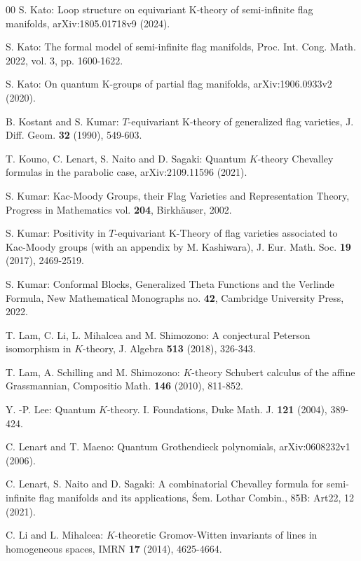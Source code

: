 \documentclass{article}
\begin{document}
\begin{thebibliography}{00}
 S. Kato: Loop structure on equivariant K-theory of semi-infinite flag manifolds, arXiv:1805.01718v9 (2024). 

 S. Kato: The formal model of semi-infinite flag manifolds, Proc. Int. Cong. Math. 2022, vol. 3, pp. 1600-1622.

 S. Kato: On quantum K-groups of partial flag manifolds, arXiv:1906.0933v2 (2020). 

 B. Kostant and S. Kumar: $T$-equivariant K-theory of generalized flag varieties, J. Diff. Geom. {\bf 32} (1990), 549-603. 

 T. Kouno, C. Lenart, S. Naito and D. Sagaki: Quantum $K$-theory Chevalley formulas in the parabolic case, arXiv:2109.11596 (2021). 

 S. Kumar: Kac-Moody Groups, their Flag Varieties and Representation Theory, Progress in Mathematics vol. {\bf 204}, Birkh\"auser, 2002.

 S. Kumar: Positivity in $T$-equivariant K-Theory of flag varieties associated to Kac-Moody groups (with an appendix by M. Kashiwara), J. Eur. Math. Soc. {\bf 19} (2017), 2469-2519. 

 S. Kumar: Conformal Blocks, Generalized Theta Functions and the Verlinde Formula, New Mathematical Monographs no. {\bf 42}, Cambridge University Press, 2022.

 T. Lam, C. Li, L. Mihalcea and M. Shimozono: A conjectural Peterson isomorphism in $K$-theory, J. Algebra {\bf 513} (2018), 326-343. 

 T. Lam, A. Schilling and M. Shimozono: $K$-theory Schubert calculus of the affine Grassmannian, Compositio Math. {\bf 146} (2010), 811-852. 

 Y. -P. Lee: Quantum $K$-theory. I. Foundations, Duke Math. J. {\bf 121} (2004), 389-424. 

 C. Lenart and T. Maeno: Quantum Grothendieck polynomials, arXiv:0608232v1 (2006). 

 C. Lenart, S. Naito and D. Sagaki: A combinatorial Chevalley formula for semi-infinite flag manifolds and its applications, \'Sem. Lothar Combin., 85B: Art22, 12 (2021).

   C. Li and L. Mihalcea: $K$-theoretic Gromov-Witten invariants of lines in homogeneous spaces, IMRN {\bf 17} (2014),
4625-4664.


\end{thebibliography}
\end{document}

